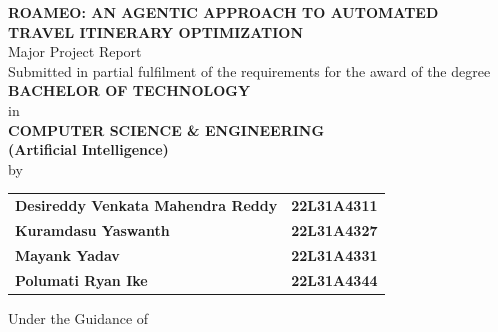 \documentclass[12pt,a4paper]{report}
\begin{document}
\pagestyle{frontmatterstyle}



\begin{titlepage}
\thispagestyle{empty}
\centering

\vspace*{-0.5cm}

{\large\bfseries ROAMEO: AN AGENTIC APPROACH TO AUTOMATED\\
TRAVEL ITINERARY OPTIMIZATION}\\[0.2cm]

{\large Major Project Report}\\[0.2cm]

{\normalsize Submitted in partial fulfilment of the requirements 
for the award of the degree}\\[0.5cm]

{\Large\bfseries BACHELOR OF TECHNOLOGY}\\[0.1cm]

{\large in}\\[0.1cm]

{\large\bfseries COMPUTER SCIENCE \& ENGINEERING\\
(Artificial Intelligence)}\\[0.4cm]

{\normalsize by}\\[0.3cm]

\begin{tabular}{ll}
\textbf{Desireddy Venkata Mahendra Reddy} & \textbf{22L31A4311} \\
\textbf{Kuramdasu Yaswanth} & \textbf{22L31A4327} \\
\textbf{Mayank Yadav} & \textbf{22L31A4331} \\
\textbf{Polumati Ryan Ike} & \textbf{22L31A4344}
\end{tabular}

\vspace{0.6cm}

{\normalsize Under the Guidance of}\\[0.2cm]


\end{titlepage}
\end{document}
